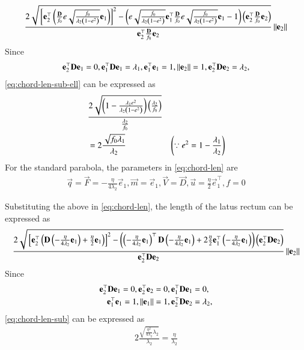 \begin{enumerate}[label=\thesubsection.\arabic*.,ref=\thesubsection.\theenumi]
\begin{align}
 \frac{2\sqrt{
{}\left[
\mathbf{e}_2^{\top}\left(\frac{\mathbf{D}}{f_0} e\sqrt{\frac{f_0}{\lambda_2\left(1-e^2\right)}} \mathbf{e }_1\right)
\right]^2
-
\left(
 e\sqrt{\frac{f_0}{\lambda_2\left(1-e^2\right)}} \mathbf{e }_1^{\top}\frac{\mathbf{D}}{f_0} e\sqrt{\frac{f_0}{\lambda_2\left(1-e^2\right)}} \mathbf{e }_1 -1 
\right)
\left(\mathbf{e}_2^{\top}\frac{\mathbf{D}}{f_0}\mathbf{e}_2\right)
}
}
{
\mathbf{e}_2^{\top}\frac{\mathbf{D}}{f_0}\mathbf{e}_2
}\left\lVert\mathbf{e}_2\right\rVert
\label{eq:chord-len-sub-ell}
  \end{align}
  Since 
  \begin{align}
\mathbf{e}_2^{\top}\mathbf{D}\mathbf{e}_1 = 0, 
\mathbf{e}_1^{\top}\mathbf{D}\mathbf{e}_1 = \lambda_1,
\mathbf{e}_1^{\top}\mathbf{e}_1 = 1,
	  \left\lVert\mathbf{e}_2\right\rVert = 1,
\mathbf{e}_2^{\top}\mathbf{D}\mathbf{e}_2 = \lambda_2,
  \end{align}
\eqref{eq:chord-len-sub-ell} can be expressed as 
  \begin{align}
	&		\frac{2\sqrt{\left(1-\frac{\lambda_1e^2}{{\lambda_2\left(1-e^2\right)}}\right)\left(\frac{\lambda_2}{f_0}\right)}}
{
	\frac{\lambda_2}{f_0}
	} 	
	\\
	&=		2\frac{\sqrt{
		f_0\lambda_1}}{\lambda_2}
 & \left( \because e^2 = 1-\frac{\lambda_1}{\lambda_2}\right)
		   \end{align}
For the standard parabola, the parameters in 
\eqref{eq:chord-len} are
\begin{align}  
	\vec{q} =\vec{F} =  -\frac{\eta}{4\lambda_2}\vec{e}_1, \vec{m} = \vec{e}_1, \vec{V} = \vec{D},
	\vec{u} = \frac{\eta}{2}\vec{e}_1^{\top}, f = 0
\end{align}  

Substituting the above in
\eqref{eq:chord-len}, 
the length of the latus rectum  can be expressed as
\begin{align}
 \frac{2\sqrt{
{}\left[
\mathbf{e}_2^{\top}\left(\mathbf{D}\left(-\frac{\eta}{4\lambda_2}\mathbf{e}_1\right)+\frac{\eta}{2}\mathbf{e}_1\right)
\right]^2
-
\left(
\left(-\frac{\eta}{4\lambda_2}\mathbf{e}_1\right)^{\top}\mathbf{D}\left(-\frac{\eta}{4\lambda_2}\mathbf{e}_1\right) + 2\frac{\eta}{2}\mathbf{e}_1^{\top}\left(-\frac{\eta}{4\lambda_2}\mathbf{e}_1\right) 
\right)
\left(\mathbf{e}_2^{\top}\mathbf{D}\mathbf{e}_2\right)
}
}
{
\mathbf{e}_2^{\top}\mathbf{D}\mathbf{e}_2
}\left\lVert\mathbf{e}_2\right\rVert
\label{eq:chord-len-sub}
  \end{align}
  Since 
  \begin{align}
\mathbf{e}_2^{\top}\mathbf{D}\mathbf{e}_1 = 0, 
\mathbf{e}_2^{\top}\mathbf{e}_2 = 0,
	  \mathbf{e}_1^{\top}\mathbf{D}\mathbf{e}_1 &= 0,\
	  \\
\mathbf{e}_1^{\top}\mathbf{e}_1 = 1,
	  \left\lVert\mathbf{e}_1\right\rVert = 1,
	  \mathbf{e}_2^{\top}\mathbf{D}\mathbf{e}_2 &= \lambda_2,
  \end{align}
\eqref{eq:chord-len-sub} can be expressed as 
  \begin{align}
	  2 \frac{\sqrt{\frac{\eta^2}{4\lambda_2}\lambda_2}}{\lambda_2}
	  = \frac{\eta}{\lambda_2}
  \end{align}
%

		\end{enumerate}
